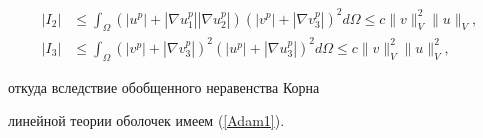 \begin{pf}
\begin{align*}
%


| I_2 | &\le


\int_ \Omega ( |u^p | + | \nabla u^p_1 |


| \nabla u^p_2 | )


( |v^p | + | \nabla v^p_3 | )^2


d\Omega \le c\| v \|_V^2 \|u\|_V,\\


%


| I_3 | &\le


\int_ \Omega


( |v^p | + | \nabla v^p_3 | )^2


( |u^p | + | \nabla u^p_3 | )^2


d\Omega \le c\| v \|_V^2 \|u\|_V^2,


\end{align*}


откуда вследствие обобщенного неравенства Корна 


линейной теории оболочек имеем (\ref{Adam1}). \end{pf}





